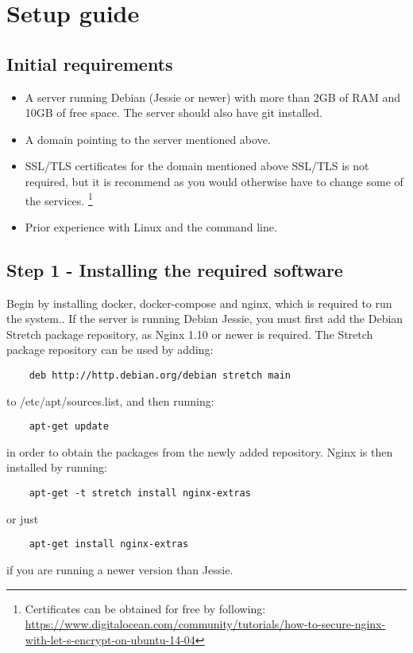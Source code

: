 
\chapter{Setup guide}
\section*{Initial requirements}
\begin{itemize}
    \item A server running Debian (Jessie or newer) with more than 2GB of RAM and 10GB of free space. The server should also have git installed.
    \item A domain pointing to the server mentioned above.
    \item SSL/TLS certificates for the domain mentioned above SSL/TLS is not required, but it is recommend as you would otherwise have to change some of the services.
    \footnote{Certificates can be obtained for free by following: \url{https://www.digitalocean.com/community/tutorials/how-to-secure-nginx-with-let-s-encrypt-on-ubuntu-14-04}}
    \item Prior experience with Linux and the command line.
\end{itemize}

\section*{Step 1 - Installing the required software}
Begin by installing docker, docker-compose and nginx, which is required to run the system..
If the server is running Debian Jessie, you must first add the Debian Stretch package repository, as Nginx 1.10 or newer is required.
\clearpage %
The Stretch package repository can be used by adding:
\begin{verbatim}
    deb http://http.debian.org/debian stretch main
\end{verbatim}
to /etc/apt/sources.list, and then running:
\begin{verbatim}
    apt-get update
\end{verbatim}
in order to obtain the packages from the newly added repository.
Nginx is then installed by running:
\begin{verbatim}
    apt-get -t stretch install nginx-extras
\end{verbatim}
or just
\begin{verbatim}
    apt-get install nginx-extras
\end{verbatim}
if you are running a newer version than Jessie.


